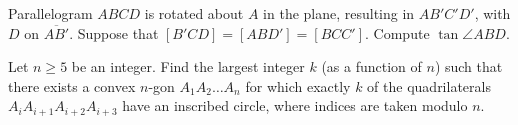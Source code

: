 \documentclass{scrartcl}
\providecommand{\ol}{\overline}
\begin{document}
\begin{problem}[ARML 2023 T10]
	Parallelogram $ABCD$ is rotated about $A$ in the plane, 
	resulting in $AB'C'D'$, with $D$ on $\ol{AB'}$.
	Suppose that $[B'CD]=[ABD']=[BCC']$. Compute $\tan\angle ABD$.
\end{problem}

\begin{niceprob}[USAMO 1998/6]
	Let $n \geq 5$ be an integer. Find the largest integer $k$ (as a function of $n$)
	such that there exists a convex $n$-gon $A_{1}A_{2}\dots A_{n}$
	for which exactly $k$ of the quadrilaterals $A_{i}A_{i+1}A_{i+2}A_{i+3}$ have an
	inscribed circle, where indices are taken modulo $n$. 
\end{niceprob}
\end{document}
